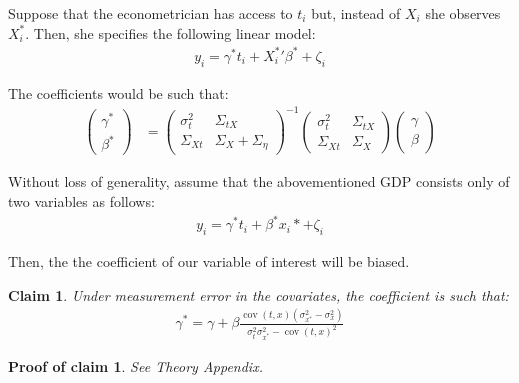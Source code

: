 \documentclass[10pt]{article}
\newtheorem{claim}{Claim}
\newtheorem{claimproof}{Proof of claim}[claim]
\begin{document}
        Suppose that the econometrician has access to $t_i$ but, instead of $X_i$ she observes $X^*_i$. Then, she specifies the following linear model:
        \begin{align}
            y_i = \gamma^* t_i + {X^{*}_i}' \beta^* + \zeta_i
        \end{align}
        
        The coefficients would be such that:
        \begin{align}
            \left(\begin{array}{l}
        {\gamma}^* \\
        {\beta}^*
        \end{array}\right)
        & =\left(\begin{array}{cc}
        {\sigma}^2_{t} & \Sigma_{tX} \\
        \Sigma_{Xt} & {\Sigma}_{X}+{\Sigma}_{\eta}
        \end{array}\right)^{-1}\left(\begin{array}{cc}
        {\sigma}^2_{t} & \Sigma_{tX} \\
        \Sigma_{Xt} & {\Sigma}_{X}
        \end{array}\right)\left(\begin{array}{l}
        {\gamma} \\
        {\beta}
        \end{array}\right)
        \end{align}
        
        Without loss of generality, assume that the abovementioned GDP consists only of two variables as follows:
        \begin{align}
                    y_i = \gamma^* t_i +  \beta^*x_i* + \zeta_i
        \end{align}
        
        Then, the the coefficient of our variable of interest will be biased.
        \begin{claim}
        \label{claim:one}
        Under measurement error in the covariates, the coefficient is such that:
            \begin{align}
                \gamma^* = \gamma + \beta\frac{\operatorname{cov}(t,x)(\sigma^2_{x^*}-\sigma^2_x)}{\sigma_{t}^2\sigma_{x^*}^2-\operatorname{cov}({t,x})^2}
            \end{align}
        \end{claim}

        \begin{claimproof}
            See Theory Appendix.
        \end{claimproof}
\end{document}

